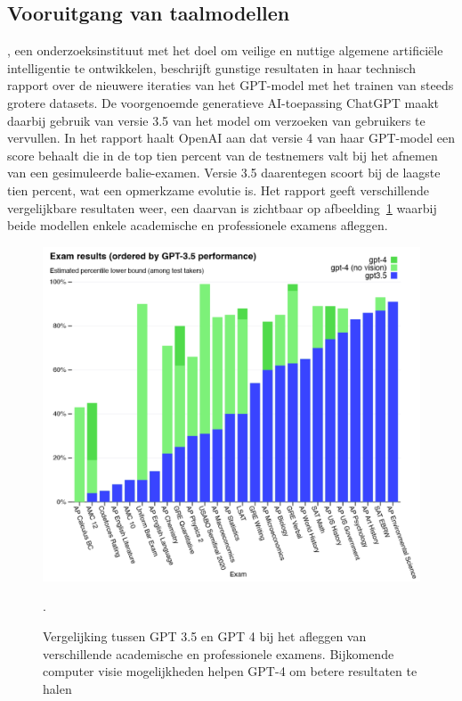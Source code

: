 \subsection{Vooruitgang van taalmodellen}
\label{subsec:vooruitgang-van-taalmodellen}
\textcite{OpenAI2023}, een onderzoeksinstituut met het doel om veilige en nuttige algemene artifici\"ele intelligentie te ontwikkelen, beschrijft gunstige resultaten in haar technisch rapport over de nieuwere iteraties van het GPT-model met het trainen van steeds grotere datasets.
De voorgenoemde generatieve AI-toepassing ChatGPT maakt daarbij gebruik van versie 3.5 van het model om verzoeken van gebruikers te vervullen.
In het rapport haalt OpenAI aan dat versie 4 van haar GPT-model een score behaalt die in de top tien percent van de testnemers valt bij het afnemen van een gesimuleerde balie-examen.
Versie 3.5 daarentegen scoort bij de laagste tien percent, wat een opmerkzame evolutie is.
Het rapport geeft verschillende vergelijkbare resultaten weer, een daarvan is zichtbaar op afbeelding~\ref{fig:gpt3.5-versus-4} waarbij beide modellen enkele academische en professionele examens afleggen.
\begin{figure}[H]
    \begin{center}
        \includegraphics[scale=0.35]{images/gpt35-vs-4-exam-results}
        \caption{Vergelijking tussen GPT 3.5 en GPT 4 bij het afleggen van verschillende academische en professionele examens. Bijkomende computer visie mogelijkheden helpen GPT-4 om betere resultaten te halen~\autocite{OpenAI2023}}.
        \label{fig:gpt3.5-versus-4}
    \end{center}
\end{figure}

